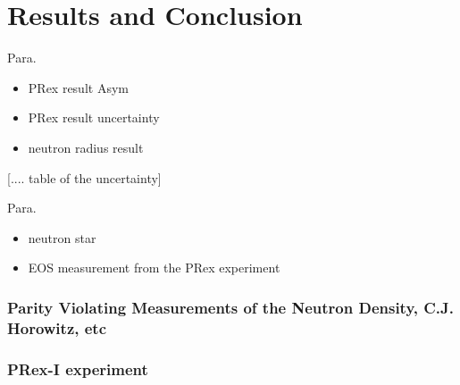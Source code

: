\chapter{Results and Conclusion}

Para.

\begin{itemize}
    \item PRex result Asym 
    \item PRex result uncertainty
    \item neutron radius result
\end{itemize}

[....  table of the uncertainty]

Para. 


\begin{itemize}
    \item neutron star
\end{itemize}

\begin{itemize}
    \item EOS measurement from the PRex experiment 
\end{itemize}

\subsection{ Parity Violating Measurements of the Neutron Density, C.J. Horowitz, etc}
\subsection{PRex-I experiment}
